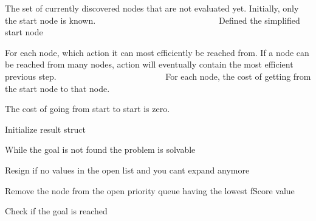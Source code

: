 The set of currently discovered nodes that are not evaluated yet. Initially, only the start node is known. ~\newline
~\newline
~\newline
~\newline
~\newline
~\newline
~\newline
~\newline
~\newline
~\newline
~\newline
~\newline
~\newline
~\newline
~\newline
~\newline
~\newline
 Defined the simplified start node

For each node, which action it can most efficiently be reached from. If a node can be reached from many nodes, action will eventually contain the most efficient previous step. ~\newline
~\newline
~\newline
~\newline
~\newline
~\newline
~\newline
~\newline
~\newline
~\newline
~\newline
~\newline
~\newline
~\newline
~\newline
 For each node, the cost of getting from the start node to that node.

The cost of going from start to start is zero.

Initialize result struct

While the goal is not found the problem is solvable

Resign if no values in the open list and you can\textquotesingle{}t expand anymore

Remove the node from the open priority queue having the lowest f\+Score value

Check if the goal is reached


